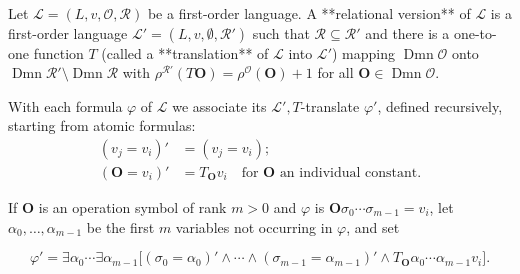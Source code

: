 Let $\mathcal{L} = (L, v, \mathcal{O}, \mathcal{R})$ be a first-order language. A **relational version** of $\mathcal{L}$ is a first-order language $\mathcal{L}' = (L, v, \emptyset, \mathcal{R}')$ such that $\mathcal{R} \subseteq \mathcal{R}'$ and there is a one-to-one function $T$ (called a **translation** of $\mathcal{L}$ into $\mathcal{L}'$) mapping $\operatorname{Dmn}\mathcal{O}$ onto $\operatorname{Dmn}\mathcal{R}' \setminus \operatorname{Dmn}\mathcal{R}$ with $\rho^{\mathcal{R}'}(T\mathbf{O}) = \rho^{\mathcal{O}}(\mathbf{O}) + 1$ for all $\mathbf{O} \in \operatorname{Dmn}\mathcal{O}$.

With each formula $\varphi$ of $\mathcal{L}$ we associate its $\mathcal{L}',T$-translate $\varphi'$, defined recursively, starting from atomic formulas:
\begin{align*}
(v_j = v_i)' &= (v_j = v_i); \\
(\mathbf{O} = v_i)' &= T_{\mathbf{O}} v_i \quad\text{for $\mathbf{O}$ an individual constant.}
\end{align*}

If $\mathbf{O}$ is an operation symbol of rank $m > 0$ and $\varphi$ is $\mathbf{O}\sigma_0\cdots\sigma_{m-1} = v_i$, let $\alpha_0,\ldots,\alpha_{m-1}$ be the first $m$ variables not occurring in $\varphi$, and set

$$\varphi' = \exists\alpha_0\cdots\exists\alpha_{m-1}\big[(\sigma_0 = \alpha_0)' \land \cdots \land (\sigma_{m-1} = \alpha_{m-1})' \land T_{\mathbf{O}}\alpha_0\cdots\alpha_{m-1}v_i\big].$$
